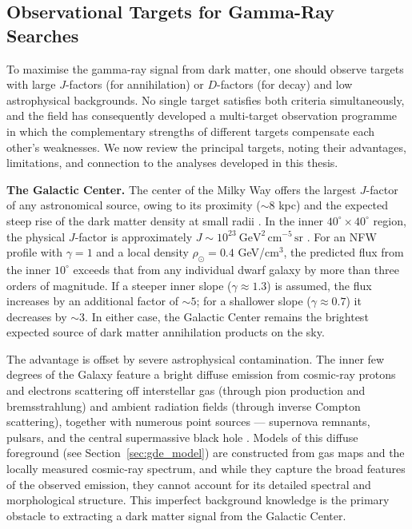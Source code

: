 \subsection{Observational Targets for Gamma-Ray Searches}
\label{sec:targets}

To maximise the gamma-ray signal from dark matter, one should observe targets with large $J$-factors (for annihilation) or $D$-factors (for decay) and low astrophysical backgrounds.
No single target satisfies both criteria simultaneously, and the field has consequently developed a multi-target observation programme in which the complementary strengths of different targets compensate each other's weaknesses.
We now review the principal targets, noting their advantages, limitations, and connection to the analyses developed in this thesis.

\textbf{The Galactic Center.}
The center of the Milky Way offers the largest $J$-factor of any astronomical source, owing to its proximity ($\sim 8$ kpc) and the expected steep rise of the dark matter density at small radii \cite{Hooper:2024}. In the inner $40^\circ \times 40^\circ$ region, the physical $J$-factor is approximately $J \sim 10^{23}~\mathrm{GeV}^2\,\mathrm{cm}^{-5}\,\mathrm{sr}$ \cite{Chang_2018}.
For an NFW profile with $\gamma = 1$ and a local density $\rho_\odot = 0.4$ GeV/cm$^3$, the predicted flux from the inner $10^\circ$ exceeds that from any individual dwarf galaxy by more than three orders of magnitude.
If a steeper inner slope ($\gamma \approx 1.3$) is assumed, the flux increases by an additional factor of $\sim 5$; for a shallower slope ($\gamma \approx 0.7$) it decreases by $\sim 3$.
In either case, the Galactic Center remains the brightest expected source of dark matter annihilation products on the sky.

The advantage is offset by severe astrophysical contamination.
The inner few degrees of the Galaxy feature a bright diffuse emission from cosmic-ray protons and electrons scattering off interstellar gas (through pion production and bremsstrahlung) and ambient radiation fields (through inverse Compton scattering), together with numerous point sources --- supernova remnants, pulsars, and the central supermassive black hole \cite{Hooper:2024}.
Models of this diffuse foreground (see Section~\ref{sec:gde_model}) are constructed from gas maps and the locally measured cosmic-ray spectrum, and while they capture the broad features of the observed emission, they cannot account for its detailed spectral and morphological structure.
This imperfect background knowledge is the primary obstacle to extracting a dark matter signal from the Galactic Center.

